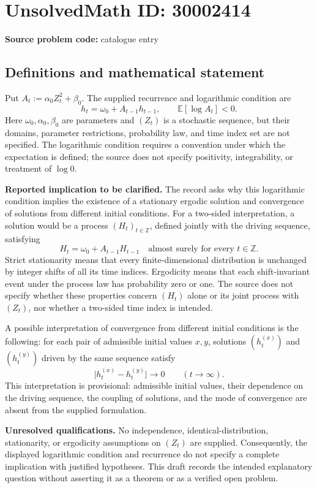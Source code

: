 \documentclass[11pt]{article}
\newcommand{\Z}{\mathbb{Z}}
\newcommand{\E}{\mathbb{E}}
\begin{document}
\section*{UnsolvedMath ID: 30002414}
\textbf{Source problem code:} catalogue entry
\subsection{Definitions and mathematical statement}
Put \(A_t:=\alpha_0 Z_t^2+\beta_0\). The supplied recurrence and logarithmic condition are
\[
h_t=\omega_0+A_{t-1}h_{t-1},\qquad \E[\log A_t]<0.
\]
Here \(\omega_0,\alpha_0,\beta_0\) are parameters and \((Z_t)\) is a stochastic sequence, but their domains, parameter restrictions, probability law, and time index set are not specified. The logarithmic condition requires a convention under which the expectation is defined; the source does not specify positivity, integrability, or treatment of \(\log 0\).

\textbf{Reported implication to be clarified.} The record asks why this logarithmic condition implies the existence of a stationary ergodic solution and convergence of solutions from different initial conditions. For a two-sided interpretation, a solution would be a process \((H_t)_{t\in\Z}\), defined jointly with the driving sequence, satisfying
\[
H_t=\omega_0+A_{t-1}H_{t-1}\quad\text{almost surely for every }t\in\Z.
\]
Strict stationarity means that every finite-dimensional distribution is unchanged by integer shifts of all its time indices. Ergodicity means that each shift-invariant event under the process law has probability zero or one. The source does not specify whether these properties concern \((H_t)\) alone or its joint process with \((Z_t)\), nor whether a two-sided time index is intended.

A possible interpretation of convergence from different initial conditions is the following: for each pair of admissible initial values \(x,y\), solutions \((h_t^{(x)})\) and \((h_t^{(y)})\) driven by the same sequence satisfy
\[
\lvert h_t^{(x)}-h_t^{(y)}\rvert\longrightarrow0\qquad(t\to\infty).
\]
This interpretation is provisional: admissible initial values, their dependence on the driving sequence, the coupling of solutions, and the mode of convergence are absent from the supplied formulation.

\textbf{Unresolved qualifications.} No independence, identical-distribution, stationarity, or ergodicity assumptions on \((Z_t)\) are supplied. Consequently, the displayed logarithmic condition and recurrence do not specify a complete implication with justified hypotheses. This draft records the intended explanatory question without asserting it as a theorem or as a verified open problem.
\end{document}

